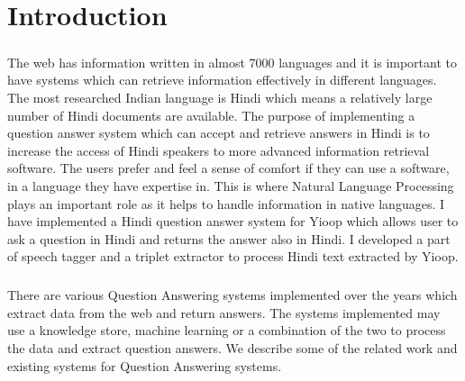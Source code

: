 \chapter{Introduction}

\paragraph{}
The web has information written in almost 7000 languages and it is important to
have systems which can retrieve information effectively in different languages. The most researched Indian language is Hindi which means a relatively large number of Hindi documents are available. The purpose of implementing a question answer system which can accept and retrieve answers in Hindi is  to increase the access of Hindi speakers to more advanced information retrieval software. The users prefer and feel a sense of comfort if they can use a software, in a language they have expertise in. This is where Natural Language Processing \cite{chowdhury2003natural} plays an important role as it helps to handle information in native languages. I have implemented  a Hindi question answer system for Yioop which allows user to ask a question in Hindi and returns the answer also in Hindi. I developed a part of speech tagger and a triplet extractor to process Hindi text extracted by Yioop.

\paragraph{}
There are various Question Answering systems implemented over the years which extract data from the web and return answers. The systems implemented may use a knowledge store, machine learning or a combination of the two to process the data and extract question answers. We describe some of the related work and existing systems for Question Answering systems.

